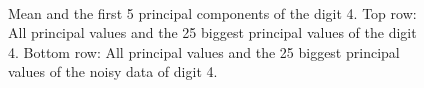 \documentclass[a4paper, 12pt, titlepage]{article}
\begin{document}
\begin{figure}[H]
	\centering
	\\
	\caption{\protect{} Mean and the first 5 principal components of the digit 4. \protect{} Top row: All principal values and the 25 biggest principal values of the digit 4. Bottom row: All principal values and the 25 biggest principal values of the noisy data of digit 4.}
\end{figure}
\end{document}
